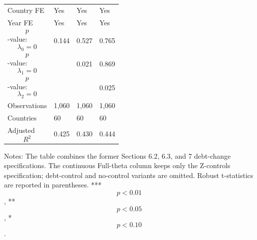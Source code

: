 \begin{table}[H]
\begin{threeparttable}
\begin{tabularx}{\textwidth}{lYYY}
Country FE & Yes & Yes & Yes \\
Year FE & Yes & Yes & Yes \\
$$p$$-value: $$\lambda_0=0$$ & 0.144 & 0.527 & 0.765 \\
$$p$$-value: $$\lambda_1=0$$ &  & 0.021 & 0.869 \\
$$p$$-value: $$\lambda_2=0$$ &  &  & 0.025 \\
Observations & 1,060 & 1,060 & 1,060 \\
Countries & 60 & 60 & 60 \\
Adjusted $$R^2$$ & 0.425 & 0.430 & 0.444 \\
\bottomrule
\end{tabularx}
\begin{tablenotes}[flushleft]\footnotesize
\item Notes: The table combines the former Sections 6.2, 6.3, and 7 debt-change specifications. The continuous Full-theta column keeps only the Z-controls specification; debt-control and no-control variants are omitted. Robust t-statistics are reported in parentheses. *** $$p<0.01$$, ** $$p<0.05$$, * $$p<0.10$$.
\end{tablenotes}
\end{threeparttable}
\end{table}
